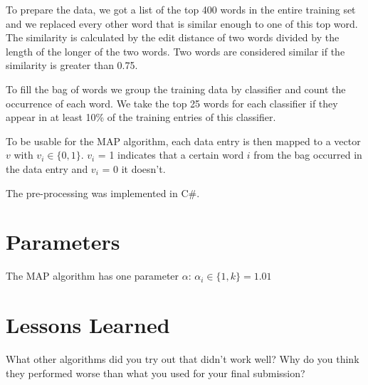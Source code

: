 \documentclass[a4paper, 11pt]{article}
\begin{document}
To prepare the data, we got a list of the top 400 words in the entire training set and we replaced every other word that is similar enough to one of this top word. The similarity is calculated by the edit distance of two words divided by the length of the longer of the two words. Two words are considered similar if the similarity is greater than 0.75.

To fill the bag of words we group the training data by classifier and count the occurrence of each word. We take the top 25 words for each classifier if they appear in at least 10\% of the training entries of this classifier.

To be usable for the MAP algorithm, each data entry is then mapped to a vector $v$ with $v_i \in \lbrace0, 1\rbrace$. $v_i$ = 1 indicates that a certain word $i$ from the bag occurred in the data entry and $v_i$ = 0 it doesn't.

The pre-processing was implemented in C\#.

\section{Parameters}
The MAP algorithm has one parameter $\alpha$: $\alpha_i \in \lbrace1, k \rbrace = 1.01$



\section{Lessons Learned} What other algorithms did you try out that didn't work well?
Why do you think they performed worse than what you used for your final submission?
\end{document}
